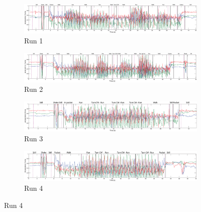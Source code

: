 \begin{figure}
  \centering
  \begin{subfigure}{1\textwidth}
    \includegraphics[width=\textwidth]{./Figures/chapter6/data_collection/run-1-walk-run-roemer/data_plot_acc_with_discovered_cps.eps}
    \caption{Run 1}
    \label{fig:data_with_cps_run_1}
  \end{subfigure}

  \begin{subfigure}{1\textwidth}
    \includegraphics[width=\textwidth]{./Figures/chapter6/data_collection/run-2-walk-run-jos/data_plot_acc_with_discovered_cps.eps}
    \caption{Run 2}
    \label{fig:data_with_cps_run_2}
  \end{subfigure}

  \begin{subfigure}{1\textwidth}
    \includegraphics[width=\textwidth]{./Figures/chapter6/data_collection/run-4-run-fountain-roemer/data_plot_acc_with_discovered_cps.eps}
    \caption{Run 3}
    \label{fig:data_with_cps_run_3}
  \end{subfigure}

  \begin{subfigure}{1\textwidth}
    \includegraphics[width=\textwidth]{./Figures/chapter6/data_collection/run-5-run-fountain-jos/data_plot_acc_with_discovered_cps.eps}
    \caption{Run 4}
    \label{fig:data_with_cps_run_4}
  \end{subfigure}


\end{figure}

